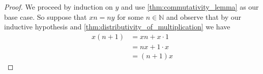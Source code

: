 \documentclass{article}
\theoremstyle{definition}
\theoremstyle{definition}
\theoremstyle{plain}
\theoremstyle{remark}
\theoremstyle{plain}
\theoremstyle{remark}
\theoremstyle{plain}
\theoremstyle{plain}
\theoremstyle{plain}
\theoremstyle{plain}
\begin{document}
\begin{proof}
  We proceed by induction on \( y \) and use \autoref{thm:commutativity_lemma}
  as our base case. So suppose that \(xn = ny\) for some \( n \in \mathbb{N} \) 
  and observe that by our inductive hypothesis and 
  \autoref{thm:distributivity_of_multiplication} we have
  \begin{align*}
    x(n+1) &= xn + x \cdot 1 \\
           &= nx + 1 \cdot x \\
           &= (n+1)x
  \end{align*}
\end{proof}



\end{document}
